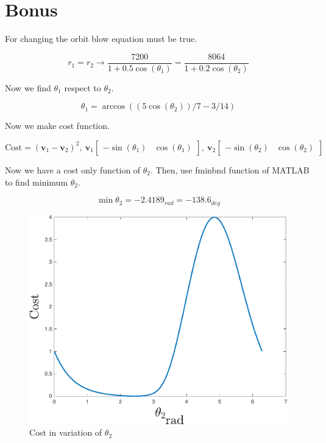 \section{Bonus}
For changing the orbit blow equation must be true.

$$
r_1 = r_2 \to \dfrac{7200}{1+0.5\cos(\theta_1)} = \dfrac{8064}{1+0.2\cos(\theta_2)}
$$

Now we find $\theta_1$ respect to $\theta_2$.

$$
\theta_1 = \arccos\left((5\cos(\theta_2))/7 - 3/14\right)
$$

Now we make cost function.

$$
\text{Cost} = \left(\boldsymbol{v}_1 - \boldsymbol{v}_2\right)^2,~\boldsymbol{v}_1 
\begin{bmatrix}
    -\sin(\theta_1) & \cos(\theta_1)
\end{bmatrix},~\boldsymbol{v}_2 
\begin{bmatrix}
    -\sin(\theta_2) &
    \cos(\theta_2)
\end{bmatrix}
$$

Now we have a cost only function of $\theta_2$. Then, use fminbnd function of MATLAB to find minimum $\theta_2$.

$$
\min \theta_2 = -2.4189_{rad} = -138.6_{deg}
$$

\begin{figure}[H] 
    \caption{Cost in variation of $\theta_2$}
    \centering 
    \includegraphics[width=12cm]{../Figure/Bonus/Cost} 
\end{figure}